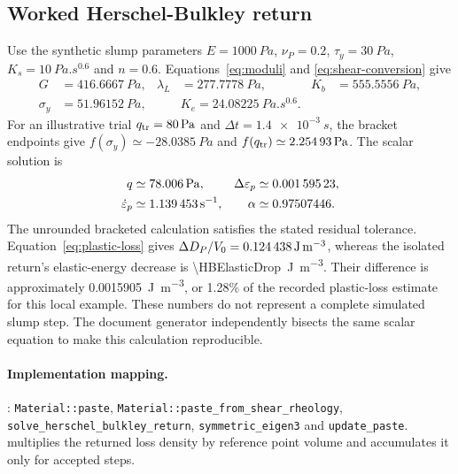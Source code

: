 \subsection{Worked Herschel-Bulkley return}
Use the synthetic slump parameters $E=\SI{1000}{Pa}$, $\nu_P=0.2$,
$\tau_y=\SI{30}{Pa}$, $K_s=\SI{10}{Pa.s^{0.6}}$ and $n=0.6$.
Equations~\eqref{eq:moduli} and \eqref{eq:shear-conversion} give
\begin{align}
 G&=\SI{416.6667}{Pa},&\lambda_L&=\SI{277.7778}{Pa},&K_b&=\SI{555.5556}{Pa},\\
 \sigma_y&=\SI{51.96152}{Pa},&&K_e=\SI{24.08225}{Pa.s^{0.6}}.
\end{align}
For an illustrative trial $q_{\rm tr}=\SI{80}{Pa}$ and
$\Delta t=\SI{1.4e-3}{s}$, the bracket endpoints give
$f(\sigma_y)\simeq-\SI{28.0385}{Pa}$ and
$f(q_{\rm tr})\simeq\SI{2.25493}{Pa}$.
The scalar solution is
\begin{align}
 q&\simeq\SI{78.006}{Pa},&
 \Delta\varepsilon_p&\simeq\num{0.00159523},\\
 \dot\varepsilon_p&\simeq\SI{1.139453}{s^{-1}},&
 \alpha&\simeq0.97507446.
\end{align}
The unrounded bracketed calculation satisfies the stated residual tolerance.
Equation~\eqref{eq:plastic-loss} gives
$\Delta D_P/V_0=\SI{0.124438}{J.m^{-3}}$, whereas the isolated return's
elastic-energy decrease is \SI{\HBElasticDrop}{J.m^{-3}}.
Their difference is approximately \SI{0.0015905}{J.m^{-3}}, or 1.28\% of the
recorded plastic-loss estimate for this local example. These numbers do not
represent a complete simulated slump step. The document generator independently
bisects the same scalar equation to make this calculation reproducible.

\paragraph{Implementation mapping.}
: \nolinkurl{Material::paste},
\nolinkurl{Material::paste_from_shear_rheology},
\nolinkurl{solve_herschel_bulkley_return}, \nolinkurl{symmetric_eigen3} and
\nolinkurl{update_paste}.  multiplies the returned
loss density by reference point volume and accumulates it only for accepted steps.

